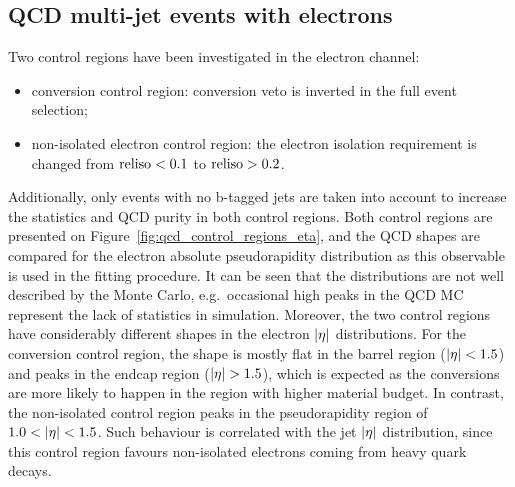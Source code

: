 \subsection{QCD multi-jet events with electrons}
Two control regions have been investigated in the electron channel:

\begin{itemize}
\item conversion control region: conversion veto is inverted in the full event selection;
\item non-isolated electron control region: the electron isolation requirement is changed from $\textrm{reliso} < 0.1$ to
$\textrm{reliso} > 0.2$.
\end{itemize}

Additionally, only events with no b-tagged jets are taken into account to increase the statistics and QCD purity in both
control regions. Both control regions are presented on Figure~\ref{fig:qcd_control_regions_eta}, and the QCD shapes are
compared for the electron absolute pseudorapidity distribution as this observable is used in the fitting procedure. It
can be seen that the distributions are not well described by the Monte Carlo, e.g.\ occasional high peaks in the QCD MC
represent the lack of statistics in simulation. Moreover, the two control regions have considerably different shapes in
the electron $\lvert \eta \rvert$ distributions. For the conversion control region, the shape is mostly flat in the barrel region
($\lvert \eta \rvert < 1.5$) and peaks in the endcap region ($\lvert \eta \rvert > 1.5$), which is expected as the conversions are more
likely to happen in the region with higher material budget. In contrast, the non-isolated control region peaks in the
pseudorapidity region of $1.0 < \lvert \eta \rvert < 1.5$. Such behaviour is correlated with the jet $\lvert \eta \rvert$ distribution,
since this control region favours non-isolated electrons coming from heavy quark decays.

